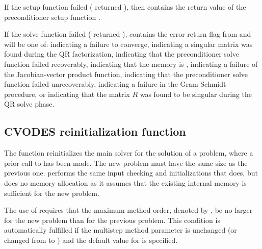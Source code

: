 {
  If the {\cvspgmr} setup function failed ( returned ),
  then  contains the return value of the preconditioner setup function .

  If the {\cvspgmr} solve function failed ( returned ),
   contains the error return flag from  and will be one
  of:  indicating a failure to converge, 
  indicating a singular matrix was found during the QR factorization, 
  indicating that the preconditioner solve function  failed recoverably,
   indicating that the {\spgmr} memory is , 
  indicating a failure of the Jacobian-vector product function, 
  indicating that the preconditioner solve function  failed unrecoverably,
   indicating a failure in the Gram-Schmidt procedure, 
  or  indicating that the matrix $R$ was found to be singular during
  the QR solve phase.
}

\subsection{CVODES reinitialization function}\label{sss:cvreinit}

The function  reinitializes the main {\cvodes} solver for
the solution of a problem, where a prior call to  has
been made. The new problem must have the same size as the previous one.
 performs the same input checking and initializations 
that  does, but does no memory allocation as it assumes that the 
existing internal memory is sufficient for the new problem.             
                                                                 
The use of  requires that the maximum method order, denoted by 
, be no larger for the new problem than for the previous problem.
This condition is  
automatically fulfilled if the multistep method parameter   
is unchanged (or changed from  to ) and the default    
value for  is specified.

